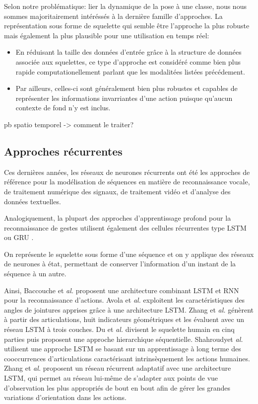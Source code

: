 Selon notre problématique: lier la dynamique de la pose à une classe, nous nous sommes majoritairement intéréssés à la dernière famille d'approches. La représentation sous forme de squelette qui semble être l'approche la plus robuste mais également la plus plausible pour une utilisation en temps réel:

\begin{itemize}
    \item En réduisant la taille des données d'entrée grâce à la structure de données associée aux squelettes, ce type d'approche est considéré comme bien plus rapide computationellement parlant que les modalitées listées précédement.
    \item Par ailleurs, celles-ci sont généralement bien plus robustes et capables de représenter les informations invarriantes d'une action puisque qu'aucun contexte de fond n'y est inclus.
\end{itemize}

pb spatio temporel -> comment le traiter?

\subsection{Approches récurrentes}

Ces dernières années, les réseaux de neurones récurrents ont  été les approches de référence pour la modélisation de séquences en matière de reconnaissance vocale, de traitement numérique des signaux, de traitement vidéo et d'analyse des données textuelles. 


Analogiquement, la plupart des approches d'apprentissage profond pour la reconnaissance de gestes utilisent également des cellules récurrentes type LSTM \cite{hochreiter1997long} ou GRU \cite{2014arXiv1406.1078C}.

On représente le squelette sous forme d’une séquence et on y applique des réseaux de neurones à état, permettant de conserver l’information d’un instant de la séquence à un autre.

Ainsi, Baccouche et\textit{ al.}\cite{baccouche2011sequential} proposent une architecture combinant LSTM et RNN pour la reconnaissance d'actions.
Avola et\textit{ al.} \cite{avola2018exploiting} exploitent les caractéristiques des angles de jointures apprises grâce à une architecture LSTM. 
Zhang et\textit{ al.}\cite{zhang2017geometric} génèrent à partir des articulations, huit indicateurs géométriques et les évaluent avec un réseau LSTM à trois couches.
Du et\textit{ al.}\cite{du2015hierarchical} divisent le squelette humain en cinq parties puis proposent une approche hierarchique séquentielle.
Shahroudyet\textit{ al.}\cite{shahroudy2016ntu} utilisent une approche LSTM se basant sur un apprentissage à long terme des cooccurrences d'articulations caractérisant intrinsèquement les actions humaines.
Zhang et\textit{ al.}\cite{zhang2017view} proposent un réseau récurrent adaptatif avec une architecture LSTM, qui permet au réseau lui-même de s'adapter aux points de vue d'observation les plus appropriés de bout en bout afin de gérer les grandes variations d'orientation dans les actions.

